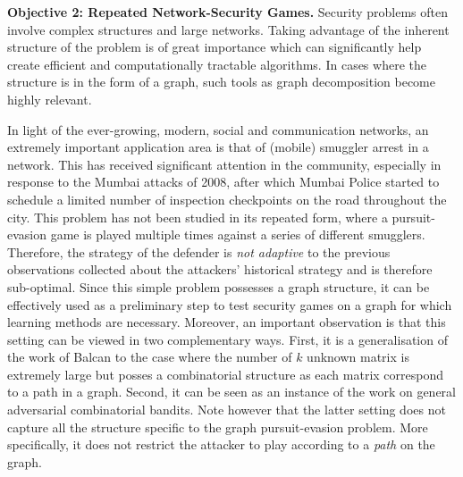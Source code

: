 

\textbf{Objective 2:  Repeated Network-Security Games.}
Security problems often involve complex structures and large networks. Taking advantage of the inherent structure of the problem is of great importance which can significantly help create efficient and computationally tractable algorithms. In cases where the structure is in the form of a graph, such tools as graph decomposition become highly relevant. 

In light of the ever-growing, modern, social and communication networks, an extremely important application area is that of (mobile) smuggler arrest in a network\cite{jain2011double}. This has received significant attention in the community, especially in  response  to  the  Mumbai  attacks  of  2008, after which  Mumbai  Police
started to schedule a limited number of inspection checkpoints
on the road throughout the city. This problem has not been studied in its repeated form, where a pursuit-evasion game is played multiple times against a series of different smugglers. Therefore, the strategy of the defender is \textit{not adaptive} to the previous observations collected about the attackers' historical strategy and is therefore sub-optimal. Since this simple problem possesses a graph structure, it can be effectively used as a preliminary step to test security games on a graph for which learning methods are necessary. Moreover, an important observation is that this setting can be viewed in two complementary ways. First,
it is a generalisation of the work of Balcan\cite{Balcan15CR} to the case where the number of $k$ unknown matrix is extremely large but posses a combinatorial structure as each matrix correspond to a path in a graph. Second, it can be seen as an instance of the work on general adversarial combinatorial bandits\cite{cesa2012combinatorial}. Note however that the latter setting does not capture all the structure specific to the graph pursuit-evasion problem. More specifically, it does not restrict the attacker to play according to a {\em path} on the graph. 


